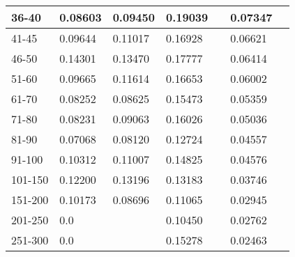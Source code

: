 \begin{table*}[h!]
\begin{tabular}{|l|l|l||l|l||l|l|}
        36-40     & 0.08603                                 & 0.09450                        & 0.19039                          &                  & 0.07347       &                  \\ \hline
        41-45     & 0.09644                                 & 0.11017                        & 0.16928                          &                  & 0.06621       &                  \\ \hline
        46-50     & 0.14301                                 & 0.13470                        & 0.17777                          &                  & 0.06414       &                  \\ \hline
        51-60     & 0.09665                                 & 0.11614                        & 0.16653                          &                  & 0.06002       &                  \\ \hline
        61-70     & 0.08252                                 & 0.08625                        & 0.15473                          &                  & 0.05359       &                  \\ \hline
        71-80     & 0.08231                                 & 0.09063                        & 0.16026                          &                  & 0.05036       &                  \\ \hline
        81-90     & 0.07068                                 & 0.08120                        & 0.12724                          &                  & 0.04557       &                  \\ \hline
        91-100    & 0.10312                                 & 0.11007                        & 0.14825                          &                  & 0.04576       &                  \\ \hline
        101-150   & 0.12200                                 & 0.13196                        & 0.13183                          &                  & 0.03746       &                  \\ \hline
        151-200   & 0.10173                                 & 0.08696                        & 0.11065                          &                  & 0.02945       &                  \\ \hline
        201-250   & 0.0                                     &                                & 0.10450                          &                  & 0.02762       &                  \\ \hline
        251-300   & 0.0                                     &                                & 0.15278                          &                  & 0.02463       &                  \\ \hline

\end{tabular}
\end{table*}
